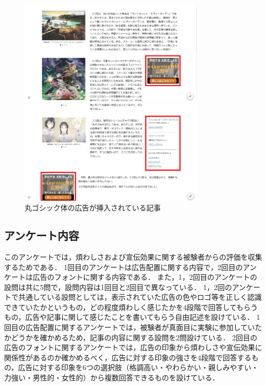 \documentclass[12pt,a4j,titlepage]{ltjsarticle}
\begin{document}
\begin{figure}[H]
  \begin{minipage}[b]{0.50\linewidth}
    \centering
    \includegraphics[height=50mm]{figures/丸ゴシック体_1.pdf}
  \end{minipage}
  \begin{minipage}[b]{0.50\linewidth}
    \centering
    \includegraphics[height=50mm]{figures/丸ゴシック体_2.pdf}
  \end{minipage}
   \caption{丸ゴシック体の広告が挿入されている記事}
    \label{fig:丸ゴシック体}
\end{figure}

\subsection{アンケート内容}
このアンケートでは，煩わしさおよび宣伝効果に関する被験者からの評価を収集するためである．
1回目のアンケートは広告配置に関する内容で，2回目のアンケートは広告のフォントに関する内容である．
また，1，2回目のアンケートの設問は共に5問で，設問内容は1回目と2回目で異なっている．
1，2回のアンケートで共通している設問としては，表示されていた広告の色やロゴ等を正しく認識できていたかというもの，どの程度煩わしく感じたかを4段階で回答してもらうもの，広告や記事に関して感じたことを書いてもらう自由記述を設けている．
1回目の広告配置に関するアンケートでは，被験者が真面目に実験に参加していたかどうかを確かめるため，記事の内容に関する設問を2問設けている．
2回目の広告のフォントに関するアンケートでは，広告の印象から煩わしさや宣伝効果に関係性があるのか確かめるべく，広告に対する印象の強さを4段階で回答するもの，広告に対する印象を6つの選択肢（格調高い・やわらかい・親しみやすい・力強い・男性的・女性的）から複数回答できるものを設けている．
\end{document}
